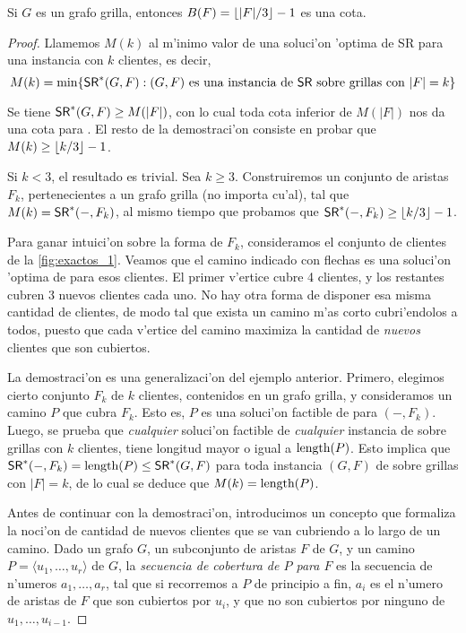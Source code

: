 \begin{theorem}
\label{th:cota_clients_count}
Si $G$ es un grafo grilla, entonces $B(F) = \left\lfloor |F| / 3 \right\rfloor - 1$ es una cota.

\begin{proof}
Llamemos $M(k)$ al m'inimo valor de una soluci'on 'optima de SR para una instancia con $k$ clientes, es decir,
\[M(k) = \min \{\textnormal{\textsf{SR}}^*(G, F) : (G, F) \text{ es una instancia de \textnormal{\textsf{SR}} sobre grillas con }|F| = k\}\]

\noindent
Se tiene $\textnormal{\textsf{SR}}^*(G, F) \geq M(|F|)$, con lo cual toda cota inferior de $M(|F|)$ nos da una cota para . El resto de la demostraci'on consiste en probar que $M(k) \geq \left\lfloor k / 3 \right\rfloor - 1$.

Si $k < 3$, el resultado es trivial. Sea $k \geq 3$. Construiremos un conjunto de aristas $F_k$, pertenecientes a un grafo grilla (no importa cu'al), tal que $M(k) = \textnormal{\textsf{SR}}^*(-, F_k)$, al mismo tiempo que probamos que $\textnormal{\textsf{SR}}^*(-, F_k) \geq \left\lfloor k / 3 \right\rfloor - 1$.

Para ganar intuici'on sobre la forma de $F_k$, consideramos el conjunto de clientes de la \autoref{fig:exactos_1}. Veamos que el camino indicado con flechas es una soluci'on 'optima de  para esos clientes. El primer v'ertice cubre 4 clientes, y los restantes cubren 3 nuevos clientes cada uno. No hay otra forma de disponer esa misma cantidad de clientes, de modo tal que exista un camino m'as corto cubri'endolos a todos, puesto que cada v'ertice del camino maximiza la cantidad de \emph{nuevos} clientes que son cubiertos.

La demostraci'on es una generalizaci'on del ejemplo anterior. Primero, elegimos cierto conjunto $F_k$ de $k$ clientes, contenidos en un grafo grilla, y consideramos un camino $P$ que cubra $F_k$. Esto es, $P$ es una soluci'on factible de  para $(-, F_k)$. Luego, se prueba que \emph{cualquier} soluci'on factible de \emph{cualquier} instancia de  sobre grillas con $k$ clientes, tiene longitud mayor o igual a $\textnormal{length}(P)$. Esto implica que $\textnormal{\textsf{SR}}^*(-, F_k) = \textnormal{length}(P) \leq \textnormal{\textsf{SR}}^*(G, F)$ para toda instancia $(G, F)$ de  sobre grillas con $|F| = k$, de lo cual se deduce que $M(k) = \textnormal{length}(P)$.

Antes de continuar con la demostraci'on, introducimos un concepto que formaliza la noci'on de cantidad de nuevos clientes que se van cubriendo a lo largo de un camino. Dado un grafo $G$, un subconjunto de aristas $F$ de $G$, y un camino $P = \langle u_1, \dots, u_r \rangle$ de $G$, la \textit{secuencia de cobertura de $P$ para $F$} es la secuencia de n'umeros $a_1, \dots, a_r$, tal que si recorremos a $P$ de principio a fin, $a_i$ es el n'umero de aristas de $F$ que son cubiertos por $u_i$, y que no son cubiertos por ninguno de $u_1, \dots, u_{i - 1}$.


\end{proof}
\end{theorem}
